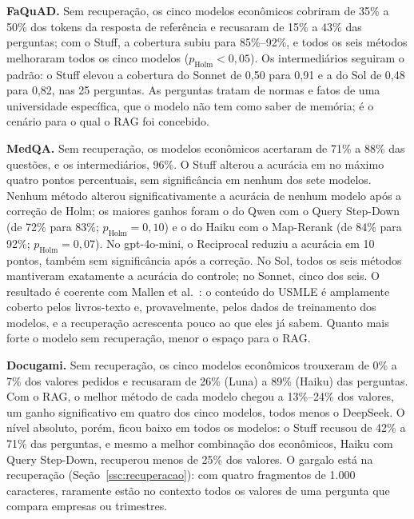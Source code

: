 


\textbf{FaQuAD.} Sem recuperação, os cinco modelos econômicos cobriram de 35\% a 50\% dos tokens da resposta de referência e recusaram de 15\% a 43\% das perguntas; com o Stuff, a cobertura subiu para 85\%--92\%, e todos os seis métodos melhoraram todos os cinco modelos ($p_{\text{Holm}} < 0{,}05$). Os intermediários seguiram o padrão: o Stuff elevou a cobertura do Sonnet de 0,50 para 0,91 e a do Sol de 0,48 para 0,82, nas 25 perguntas. As perguntas tratam de normas e fatos de uma universidade específica, que o modelo não tem como saber de memória; é o cenário para o qual o RAG foi concebido.

\textbf{MedQA.} Sem recuperação, os modelos econômicos acertaram de 71\% a 88\% das questões, e os intermediários, 96\%. O Stuff alterou a acurácia em no máximo quatro pontos percentuais, sem significância em nenhum dos sete modelos. Nenhum método alterou significativamente a acurácia de nenhum modelo após a correção de Holm; os maiores ganhos foram o do Qwen com o Query Step-Down (de 72\% para 83\%; $p_{\text{Holm}} = 0{,}10$) e o do Haiku com o Map-Rerank (de 84\% para 92\%; $p_{\text{Holm}} = 0{,}07$). No gpt-4o-mini, o Reciprocal reduziu a acurácia em 10 pontos, também sem significância após a correção. No Sol, todos os seis métodos mantiveram exatamente a acurácia do controle; no Sonnet, cinco dos seis. O resultado é coerente com Mallen et al.~\cite{mallen2023trust}: o conteúdo do USMLE é amplamente coberto pelos livros-texto e, provavelmente, pelos dados de treinamento dos modelos, e a recuperação acrescenta pouco ao que eles já sabem. Quanto mais forte o modelo sem recuperação, menor o espaço para o RAG.

\textbf{Docugami.} Sem recuperação, os cinco modelos econômicos trouxeram de 0\% a 7\% dos valores pedidos e recusaram de 26\% (Luna) a 89\% (Haiku) das perguntas. Com o RAG, o melhor método de cada modelo chegou a 13\%--24\% dos valores, um ganho significativo em quatro dos cinco modelos, todos menos o DeepSeek. O nível absoluto, porém, ficou baixo em todos os modelos: o Stuff recusou de 42\% a 71\% das perguntas, e mesmo a melhor combinação dos econômicos, Haiku com Query Step-Down, recuperou menos de 25\% dos valores. O gargalo está na recuperação (Seção~\ref{ssc:recuperacao}): com quatro fragmentos de 1.000 caracteres, raramente estão no contexto todos os valores de uma pergunta que compara empresas ou trimestres.

